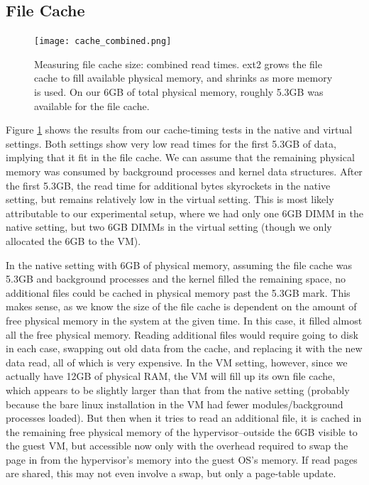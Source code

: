 \documentclass[letterpaper,twocolumn,10pt]{article}
\begin{document}
\subsection{File Cache}
\begin{figure}[!ht]
\texttt{[image: cache\_combined.png]}
\caption{Measuring file cache size: combined read times. ext2 grows the file cache to fill available physical memory, and shrinks as more memory is used. On our 6GB of total physical memory, roughly 5.3GB was available for the file cache.}
\label{fig:file_cache}
\end{figure}
Figure \ref{fig:file_cache} shows the results from our cache-timing tests in the native and virtual settings. Both settings show very low read times for the first 5.3GB of data, implying that it fit in the file cache. We can assume that the remaining physical memory was consumed by background processes and kernel data structures. After the first 5.3GB, the read time for additional bytes skyrockets in the native setting, but remains relatively low in the virtual setting. This is most likely attributable to our experimental setup, where we had only one 6GB DIMM in the native setting, but two 6GB DIMMs in the virtual setting (though we only allocated the 6GB to the VM). 

In the native setting with 6GB of physical memory, assuming the file cache was 5.3GB and background processes and the kernel filled the remaining space, no additional files could be cached in physical memory past the 5.3GB mark. This makes sense, as we know the size of the file cache is dependent on the amount of free physical memory in the system at the given time. In this case, it filled almost all the free physical memory. Reading additional files would require going to disk in each case, swapping out old data from the cache, and replacing it with the new data read, all of which is very expensive. In the VM setting, however, since we actually have 12GB of physical RAM, the VM will fill up its own file cache, which appears to be slightly larger than that from the native setting (probably because the bare linux installation in the VM had fewer modules/background processes loaded). But then when it tries to read an additional file, it is cached in the remaining free physical memory of the hypervisor--outside the 6GB visible to the guest VM, but accessible now only with the overhead required to swap the page in from the hypervisor's memory into the guest OS's memory. If read pages are shared, this may not even involve a swap, but only a page-table update. 
\end{document}

